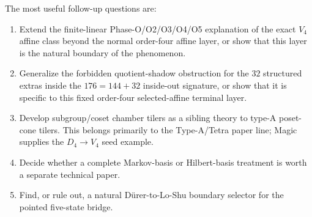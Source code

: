 \documentclass[11pt,a4paper]{article}
\theoremstyle{definition}
\theoremstyle{remark}
\newcommand{\Durer}{D\"urer\xspace}
\begin{document}
The most useful follow-up questions are:
\begin{enumerate}[leftmargin=*]
\item Extend the finite-linear Phase-O/O2/O3/O4/O5 explanation of the exact
\(V_4\) affine class beyond the normal order-four affine layer, or show that
this layer is the natural boundary of the phenomenon.
\item Generalize the forbidden quotient-shadow obstruction for the \(32\)
structured extras inside the \(176=144+32\) inside-out signature, or show that
it is specific to this fixed order-four selected-affine terminal layer.
\item Develop subgroup/coset chamber tilers as a sibling theory to type-A
poset-cone tilers.  This belongs primarily to the Type-A/Tetra paper line;
Magic supplies the \(D_4\to V_4\) seed example.
\item Decide whether a complete Markov-basis or Hilbert-basis treatment is
worth a separate technical paper.
\item Find, or rule out, a natural \Durer-to-Lo-Shu boundary selector for the
pointed five-state bridge.
\end{enumerate}



\end{document}
